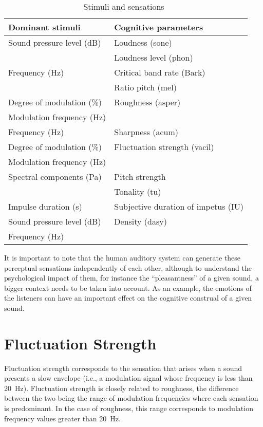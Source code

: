 \documentclass[../main.tex]{subfiles}
\begin{document}
\begin{theoreticalbackground}
\begin{table}[ht]
  \centering
  \begin{tabu} to \linewidth{ X X }
    \toprule
    \rowfont\bfseries
    Dominant stimuli & Cognitive parameters \\
    \midrule
    Sound pressure level (dB) & Loudness (sone) \\
    & Loudness level (phon) \\
    \midrule
    Frequency (Hz) & Critical band rate (Bark) \\
    & Ratio pitch (mel) \\
    \midrule
    Degree of modulation (\%) & Roughness (asper)\\
    Modulation frequency (Hz) & \\
    \midrule
    Frequency (Hz) & Sharpness (acum) \\
    \midrule
    Degree of modulation (\%) & Fluctuation strength (vacil) \\
    Modulation frequency (Hz) & \\
    \midrule
    Spectral components (Pa) & Pitch strength \\
    & Tonality (tu) \\
    \midrule
    Impulse duration (s) & Subjective duration of impetus (IU) \\
    \midrule
    Sound pressure level (dB) & Density (dasy) \\
    Frequency (Hz) & \\
    \bottomrule
  \end{tabu}
  \caption{Stimuli and sensations~\cite[pp.~70]{Mueller2012Handbook}}
\label{tab:stimsens}
\end{table}

It is important to note that the human auditory system can generate these
perceptual sensations independently of each other, although to understand the
psychological impact of them, for instance the ``pleasantness'' of a given
sound, a bigger context needs to be taken into account. As an example, the
emotions of the listeners can have an important effect on the cognitive
construal of a given sound.

\section{Fluctuation Strength}

Fluctuation strength corresponds to the sensation that arises when a sound
presents a slow envelope (i.e., a modulation signal whose frequency is less than
20~Hz). Fluctuation strength is closely related to roughness, the difference
between the two being the range of modulation frequencies where each sensation
is predominant. In the case of roughness, this range corresponds to modulation
frequency values greater than 20~Hz.


\end{theoreticalbackground}
\end{document}
